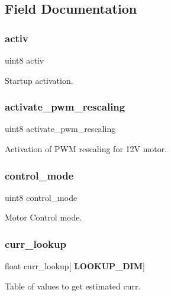 \subsection{Field Documentation}
\mbox{\label{structst__motor_a63bbebc1db55f43e0571006597a3488b}} 
\subsubsection{activ}
{\footnotesize\ttfamily uint8 activ}

Startup activation. \mbox{\label{structst__motor_a53d9d645351f4020826ab8c56c91b244}} 
\subsubsection{activate\+\_\+pwm\+\_\+rescaling}
{\footnotesize\ttfamily uint8 activate\+\_\+pwm\+\_\+rescaling}

Activation of P\+WM rescaling for 12V motor. \mbox{\label{structst__motor_af0c55b7d870673f2f6e9521c215d4b51}} 
\subsubsection{control\+\_\+mode}
{\footnotesize\ttfamily uint8 control\+\_\+mode}

Motor Control mode. \mbox{\label{structst__motor_a29cec4cab946141aae2509b04e2f5097}} 
\subsubsection{curr\+\_\+lookup}
{\footnotesize\ttfamily float curr\+\_\+lookup[\textbf{ L\+O\+O\+K\+U\+P\+\_\+\+D\+IM}]}

Table of values to get estimated curr. \mbox{\label{structst__motor_a96f2aec80e40c1bbe82186a4261ab7ac}} 
